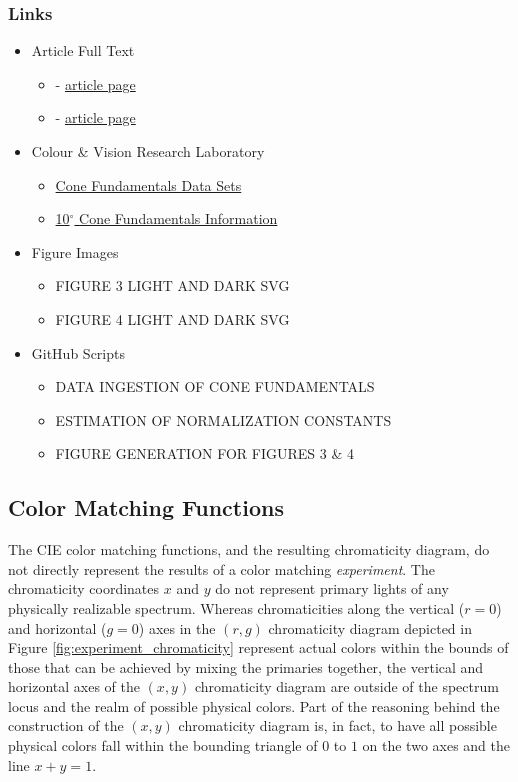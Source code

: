 \documentclass[twocolumn]{article}
\begin{document}
\subsubsection{Links}
\begin{itemize}
    \item Article Full Text
    \begin{itemize}
        \item \cite{stockman1999spectral} - \href{https://www.sciencedirect.com/science/article/pii/S0042698998002259}{article page}
        \item \cite{stockman2000spectral} - \href{https://www.sciencedirect.com/science/article/pii/S0042698900000213}{article page}
    \end{itemize}
    \item Colour \& Vision Research Laboratory
    \begin{itemize}
        \item \href{http://www.cvrl.org/cones.htm}{Cone Fundamentals Data Sets}
        \item \href{http://www.cvrl.org/database/text/cones/ss10.htm}{10$^\circ$ Cone Fundamentals Information}
    \end{itemize}
    \item Figure Images
    \begin{itemize}
        \item FIGURE 3 LIGHT AND DARK SVG
        \item FIGURE 4 LIGHT AND DARK SVG
    \end{itemize}
    \item GitHub Scripts
    \begin{itemize}
        \item DATA INGESTION OF CONE FUNDAMENTALS
        \item ESTIMATION OF NORMALIZATION CONSTANTS
        \item FIGURE GENERATION FOR FIGURES 3 \& 4
    \end{itemize}
\end{itemize}
\subsection{Color Matching Functions}
The CIE color matching functions, and the resulting chromaticity diagram, do not directly represent the results of a color matching \textit{experiment}.  The chromaticity coordinates $x$ and $y$ do not represent primary lights of any physically realizable spectrum.  Whereas chromaticities along the vertical ($r=0$) and horizontal ($g=0$) axes in the $(r,g)$ chromaticity diagram depicted in Figure \ref{fig:experiment_chromaticity} represent actual colors within the bounds of those that can be achieved by mixing the primaries together, the vertical and horizontal axes of the $(x,y)$ chromaticity diagram are outside of the spectrum locus and the realm of possible physical colors.  Part of the reasoning behind the construction of the $(x,y)$ chromaticity diagram is, in fact, to have all possible physical colors fall within the bounding triangle of $0$ to $1$ on the two axes and the line $x+y=1$.
\end{document}
